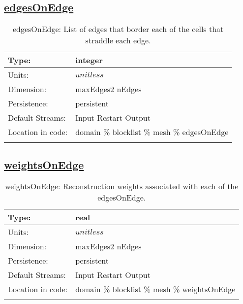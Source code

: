 \subsection[edgesOnEdge]{\hyperref[sec:var_tab_mesh]{edgesOnEdge}}
\label{subsec:var_sec_mesh_edgesOnEdge}
\begin{center}
\begin{longtable}{| p{2.0in} | p{4.0in} |}
        \hline 
        Type: & integer \\
        \hline 
        Units: & $unitless$ \\
        \hline 
        Dimension: & maxEdges2 nEdges \\
        \hline 
        Persistence: & persistent \\
        \hline 
		 Default Streams: & Input Restart Output  \\
        \hline 
		 Location in code: & domain \% blocklist \% mesh \% edgesOnEdge \\
		 \hline 
    \caption{edgesOnEdge: List of edges that border each of the cells that straddle each edge.}
\end{longtable}
\end{center}
\subsection[weightsOnEdge]{\hyperref[sec:var_tab_mesh]{weightsOnEdge}}
\label{subsec:var_sec_mesh_weightsOnEdge}
\begin{center}
\begin{longtable}{| p{2.0in} | p{4.0in} |}
        \hline 
        Type: & real \\
        \hline 
        Units: & $unitless$ \\
        \hline 
        Dimension: & maxEdges2 nEdges \\
        \hline 
        Persistence: & persistent \\
        \hline 
		 Default Streams: & Input Restart Output  \\
        \hline 
		 Location in code: & domain \% blocklist \% mesh \% weightsOnEdge \\
		 \hline 
    \caption{weightsOnEdge: Reconstruction weights associated with each of the edgesOnEdge.}
\end{longtable}
\end{center}
